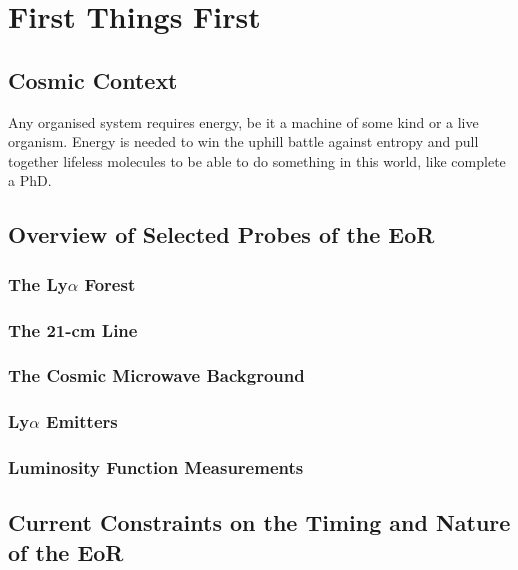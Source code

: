 


\ifpdf
    \graphicspath{{introduction/figures/PNG/}{introduction/figures/PDF/}{introduction/figures/}}
\else
    \graphicspath{{introduction/figures/EPS/}{introduction/figures/}}
\fi

\chapter{First Things First}
\section{Cosmic Context}
Any organised system requires energy, be it a machine of some kind or a live organism. Energy is needed to win the uphill battle against entropy and pull together lifeless molecules to be able to do something in this world, like complete a PhD.

\section{Overview of Selected Probes of the EoR}
\subsection{The Ly$\alpha$ Forest}
\subsection{The 21-cm Line}
\subsection{The Cosmic Microwave Background}
\subsection{Ly$\alpha$ Emitters}
\subsection{Luminosity Function Measurements}

\section{Current Constraints on the Timing and Nature of the EoR}





